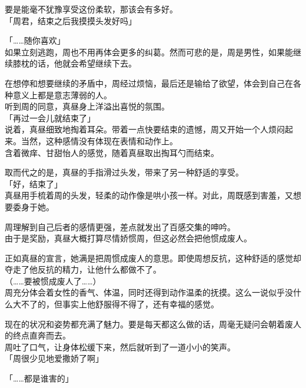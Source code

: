 要是能毫不犹豫享受这份柔软，那该会有多好。\\

「周君，结束之后我摸摸头发好吗」

「……随你喜欢」\\

如果立刻逃跑，周也不用再体会更多的纠葛。然而可悲的是，周是男性，如果能继续膝枕的话，他就会希望继续下去。

在想停和想要继续的矛盾中，周经过烦恼，最后还是输给了欲望，体会到自己在各种意义上都是意志薄弱的人。\\

听到周的同意，真昼身上洋溢出喜悦的氛围。\\

「再过一会儿就结束了」\\

说着，真昼细致地掏着耳朵。带着一点快要结束的遗憾，周又开始一个人烦闷起来。当然，这种感情没有体现在表情和动作上。\\

含着微痒、甘甜怡人的感觉，随着真昼取出掏耳勺而结束。

取而代之的是，真昼的手指滑过头发，带来了另一种舒适的享受。\\

「好，结束了」\\

真昼用手梳着周的头发，轻柔的动作像是哄小孩一样。对此，周既感到害羞，又想要委身于她。

周理解到自己后者的感情更强，差点就发出了百感交集的呻吟。\\

由于是奖励，真昼大概打算尽情娇惯周，但这必然会把他惯成废人。

正如真昼的宣言，她满是把周惯成废人的意思。即使周想反抗，这种舒适的感觉却夺走了他反抗的精力，让他什么都做不了。\\

（……要被惯成废人了……）\\

周充分体会着女性的香气、体温，同时还得到动作温柔的抚摸。这么一说似乎没什么大不了的，但事实上他舒服得不得了，还有幸福的感觉。

现在的状况和姿势都充满了魅力。要是每天都这么做的话，周毫无疑问会朝着废人的终点直奔而去。\\

周吐了口气，让身体松缓下来，然后就听到了一道小小的笑声。\\

「周很少见地爱撒娇了啊」

「……都是谁害的」

